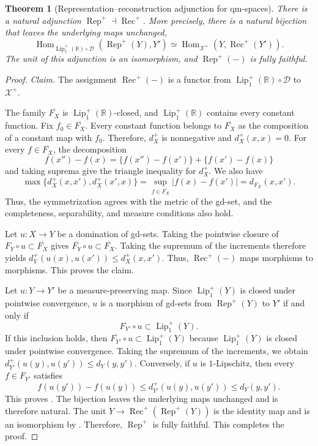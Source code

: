 \documentclass[10pt,a4paper]{amsart}
\newtheorem{theorem}{Theorem}
\newcommand{\D}{\mathcal{D}}
\newcommand{\Lup}{\operatorname{Lip}^{+}_{1}(\R)}
\newcommand{\R}{\mathbb{R}}
\newcommand{\Xp}{\mathcal{X}^{+}}
\newcommand{\lipplus}{\operatorname{Lip}^{+}_{1}}
\begin{document}
\begin{theorem}[Representation--reconstruction adjunction for qm-spaces]
\label{thm:adjunction-direction}
There is a natural adjunction $\operatorname{Rep}^{+}\dashv\operatorname{Rec}^{+}$. More precisely, there is a natural bijection that leaves the underlying maps unchanged,
\begin{equation}
\label{eq:hom-asymmetric}
\operatorname{Hom}_{\Lup\circ\D}(\operatorname{Rep}^{+}(Y),Y')\simeq\operatorname{Hom}_{\Xp}(Y,\operatorname{Rec}^{+}(Y')).
\end{equation}
The unit of this adjunction is an isomorphism, and $\operatorname{Rep}^{+}(-)$ is fully faithful.
\end{theorem}

\begin{proof}
\emph{Claim.} The assignment $\operatorname{Rec}^{+}(-)$ is a functor from $\Lup\circ\D$ to $\Xp$.

The family $\overline{F_X}$ is $\Lup$-closed, and $\Lup$ contains every constant function. Fix $f_0\in\overline{F_X}$. Every constant function belongs to $\overline{F_X}$ as the composition of a constant map with $f_0$. Therefore, $d_X^+$ is nonnegative and $d_X^+(x,x)=0$. For every $f\in\overline{F_X}$, the decomposition
\[f(x'')-f(x)=\{f(x'')-f(x')\}+\{f(x')-f(x)\}\]
and taking suprema give the triangle inequality for $d_X^+$. We also have
\[\max\{d_X^+(x,x'),d_X^+(x',x)\}=\sup_{f\in\overline{F_X}}|f(x)-f(x')|=d_{F_X}(x,x').\]
Thus, the symmetrization agrees with the metric of the gd-set, and the completeness, separability, and measure conditions also hold.

Let $u\colon X\to Y$ be a domination of gd-sets. Taking the pointwise closure of $F_Y\circ u\subset\overline{F_X}$ gives $\overline{F_Y}\circ u\subset\overline{F_X}$. Taking the supremum of the increments therefore yields $d_Y^+(u(x),u(x'))\leq d_X^+(x,x')$. Thus, $\operatorname{Rec}^{+}(-)$ maps morphisms to morphisms.
This proves the claim.

Let $u\colon Y\to Y'$ be a measure-preserving map. Since $\lipplus(Y)$ is closed under pointwise convergence, $u$ is a morphism of gd-sets from $\operatorname{Rep}^{+}(Y)$ to $Y'$ if and only if
\[F_{Y'}\circ u\subset\lipplus(Y).\]
If this inclusion holds, then $\overline{F_{Y'}}\circ u\subset\lipplus(Y)$ because $\lipplus(Y)$ is closed under pointwise convergence. Taking the supremum of the increments, we obtain $d_{Y'}^+(u(y),u(y'))\leq d_Y(y,y')$. Conversely, if $u$ is $1$-Lipschitz, then every $f\in F_{Y'}$ satisfies
\[f(u(y'))-f(u(y))\leq d_{Y'}^+(u(y),u(y'))\leq d_Y(y,y').\]
This proves . The bijection leaves the underlying maps unchanged and is therefore natural. The unit $Y\to\operatorname{Rec}^{+}(\operatorname{Rep}^{+}(Y))$ is the identity map and is an isomorphism by . Therefore, $\operatorname{Rep}^{+}$ is fully faithful.
This completes the proof.
\end{proof}
\end{document}
